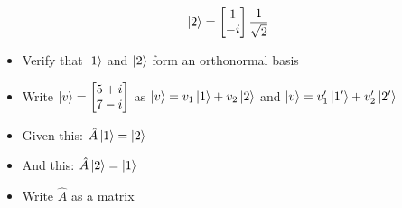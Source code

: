 $$\ket{2} = \begin{bmatrix} 1 \\ -i \\ \end{bmatrix} \frac{1}{\sqrt{2}}$$

\begin{itemize}
    \item Verify that $\ket{1}$ and $\ket{2}$ form an orthonormal basis
\end{itemize}

\hrulefill

\begin{itemize}
    \item Write $\ket{v} = \begin{bmatrix} 5+i \\ 7-i \\ \end{bmatrix}$ as $\ket{v} = v_1\ket{1} + v_2\ket{2}$ and $\ket{v} = v_1'\ket{1'} + v_2'\ket{2'}$
\end{itemize}

\hrulefill

\begin{itemize}
    \item Given this: $\hat{A}\ket{1} = \ket{2}$
    \item And this: $\hat{A}\ket{2} = \ket{1}$
    \item Write $\hat{A}$ as a matrix
\end{itemize}

